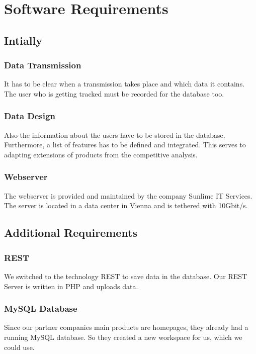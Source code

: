 \chapter{Software Requirements}
\section{Intially}
\subsection{Data Transmission}
It has to be clear when a transmission takes place and which data it contains. The user who is getting tracked must be recorded for the database too.
\subsection{Data Design}
Also the information about the users have to be stored in the database. Furthermore, a list of features has to be defined and integrated. This serves to adapting extensions of products from the competitive analysis.
\subsection{Webserver}
The webserver is provided and maintained by the company Sunlime IT Services. The server is located in a data center in Vienna and is tethered with 10Gbit/s.
\section{Additional Requirements}
\subsection{REST}
We switched to the technology REST to save data in the database. Our REST Server is written in PHP and uploads data.
\subsection{MySQL Database}
Since our partner companies main products are homepages, they already had a running MySQL database. So they created a new workspace for us, which we could use.